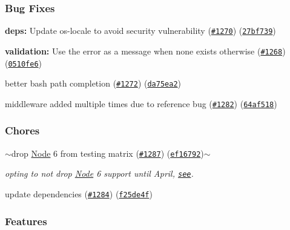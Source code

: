 \subsubsection*{Bug Fixes}


\begin{DoxyItemize}
\item {\bfseries deps\+:} Update os-\/locale to avoid security vulnerability (\href{https://github.com/yargs/yargs/issues/1270}{\tt \#1270}) (\href{https://github.com/yargs/yargs/commit/27bf739}{\tt 27bf739})
\item {\bfseries validation\+:} Use the error as a message when none exists otherwise (\href{https://github.com/yargs/yargs/issues/1268}{\tt \#1268}) (\href{https://github.com/yargs/yargs/commit/0510fe6}{\tt 0510fe6})
\item better bash path completion (\href{https://github.com/yargs/yargs/issues/1272}{\tt \#1272}) (\href{https://github.com/yargs/yargs/commit/da75ea2}{\tt da75ea2})
\item middleware added multiple times due to reference bug (\href{https://github.com/yargs/yargs/issues/1282}{\tt \#1282}) (\href{https://github.com/yargs/yargs/commit/64af518}{\tt 64af518})
\end{DoxyItemize}

\subsubsection*{Chores}


\begin{DoxyItemize}
\item $\sim$drop \mbox{\hyperlink{classNode}{Node}} 6 from testing matrix (\href{https://github.com/yargs/yargs/issues/1287}{\tt \#1287}) (\href{https://github.com/yargs/yargs/commit/ef16792}{\tt ef16792})$\sim$
\begin{DoxyItemize}
\item {\itshape opting to not drop \mbox{\hyperlink{classNode}{Node}} 6 support until April, \href{https://github.com/nodejs/Release}{\tt see}.}
\end{DoxyItemize}
\item update dependencies (\href{https://github.com/yargs/yargs/issues/1284}{\tt \#1284}) (\href{https://github.com/yargs/yargs/commit/f25de4f}{\tt f25de4f})
\end{DoxyItemize}

\subsubsection*{Features}


